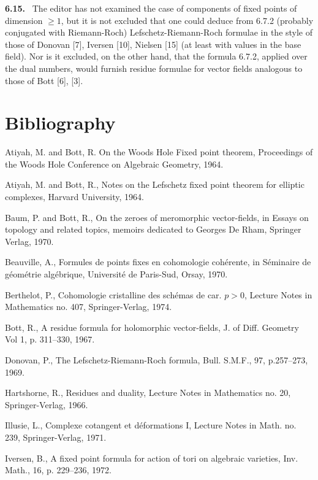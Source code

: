 \documentclass[11pt]{article}
\newenvironment{statement}[1]{\par\medskip\noindent\textbf{#1.}\ }{\par\medskip}
\begin{document}
\begin{statement}{6.15}
The editor has not examined the case of components of fixed points of dimension $\ge 1$, but it is not excluded that one could deduce from 6.7.2 (probably conjugated with Riemann-Roch) Lefschetz-Riemann-Roch formulae in the style of those of Donovan [7], Iversen [10], Nielsen [15] (at least with values in the base field). Nor is it excluded, on the other hand, that the formula 6.7.2, applied over the dual numbers, would furnish residue formulae for vector fields analogous to those of Bott [6], [3].
\end{statement}

\section*{Bibliography}
\begin{enumerate}[label={[\arabic*]},leftmargin=2.5em]
\item Atiyah, M. and Bott, R. On the Woods Hole Fixed point theorem, Proceedings of the Woods Hole Conference on Algebraic Geometry, 1964.
\item Atiyah, M. and Bott, R., Notes on the Lefschetz fixed point theorem for elliptic complexes, Harvard University, 1964.
\item Baum, P. and Bott, R., On the zeroes of meromorphic vector-fields, in Essays on topology and related topics, memoirs dedicated to Georges De Rham, Springer Verlag, 1970.
\item Beauville, A., Formules de points fixes en cohomologie cohérente, in Séminaire de géométrie algébrique, Université de Paris-Sud, Orsay, 1970.
\item Berthelot, P., Cohomologie cristalline des schémas de car. $p>0$, Lecture Notes in Mathematics no. 407, Springer-Verlag, 1974.
\item Bott, R., A residue formula for holomorphic vector-fields, J. of Diff. Geometry Vol 1, p. 311--330, 1967.
\item Donovan, P., The Lefschetz-Riemann-Roch formula, Bull. S.M.F., 97, p.257--273, 1969.
\item Hartshorne, R., Residues and duality, Lecture Notes in Mathematics no. 20, Springer-Verlag, 1966.
\item Illusie, L., Complexe cotangent et déformations I, Lecture Notes in Math. no. 239, Springer-Verlag, 1971.
\item Iversen, B., A fixed point formula for action of tori on algebraic varieties, Inv. Math., 16, p. 229--236, 1972.

\end{enumerate}
\end{document}
